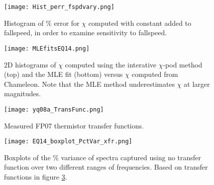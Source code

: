 \documentclass{ametsoc}
\begin{document}
\begin{figure}[t]
  \noindent\texttt{[image: Hist\_perr\_fspdvary.png]}\\
  \caption{Histogram of \% error for $\chi$ computed with constant added to fallspeed, in order to examine sensitivity to fallspeed.}
  \label{FspdSensHist}
\end{figure}


\begin{figure}[t]
  \noindent\texttt{[image: MLEfitsEQ14.png]}\\
  \caption{2D histograms of $\chi$ computed using the interative $\chi$-pod method (top) and the MLE fit (bottom) versus $\chi$ computed from Chameleon. Note that the MLE method underestimates $\chi$ at larger magnitudes.}
  \label{mlefits}
\end{figure}


\begin{figure}[t]
  \noindent\texttt{[image: yq08a\_TransFunc.png]}\\
  \caption{Measured FP07 thermistor transfer functions.  }
  \label{xfr}
\end{figure}

\begin{figure}[t]
  \noindent\texttt{[image: EQ14\_boxplot\_PctVar\_xfr.png]}\\
  \caption{Boxplots of the \% variance of spectra captured using no transfer function over two different ranges of frequencies. Based on transfer functions in figure \ref{xfr}. }
  \label{xfr2}
\end{figure}
\end{document}
